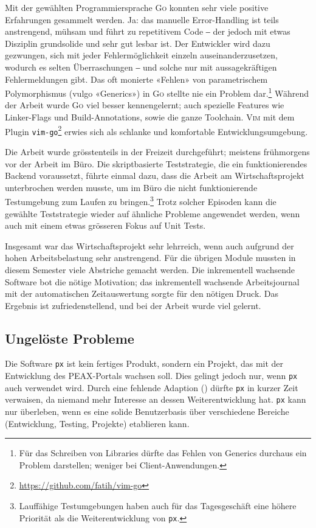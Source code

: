 Mit der gewählten Programmiersprache \textsc{Go} konnten sehr viele positive Erfahrungen gesammelt werden. Ja: das manuelle Error-Handling ist teils anstrengend, mühsam und führt zu repetitivem Code ‒ der jedoch mit etwas Disziplin grundsolide und sehr gut lesbar ist. Der Entwickler wird dazu gezwungen, sich mit jeder Fehlermöglichkeit einzeln auseinanderzusetzen, wodurch es selten Überraschungen ‒ und solche nur mit aussagekräftigen Fehlermeldungen gibt. Das oft monierte «Fehlen» von parametrischem Polymorphismus (vulgo «Generics») in \textsc{Go} stellte nie ein Problem dar.\footnote{Für das Schreiben von Libraries dürfte das Fehlen von Generics durchaus ein Problem darstellen; weniger bei Client-Anwendungen.} Während der Arbeit wurde \textsc{Go} viel besser kennengelernt; auch spezielle Features wie Linker-Flags und Build-Annotations, sowie die ganze Toolchain. \textsc{Vim} mit dem Plugin \texttt{vim-go}\footnote{\url{https://github.com/fatih/vim-go}} erwies sich als schlanke und komfortable Entwicklungsumgebung.

Die Arbeit wurde grösstenteils in der Freizeit durchgeführt; meistens frühmorgens vor der Arbeit im Büro. Die skriptbasierte Teststrategie, die ein funktionierendes Backend voraussetzt, führte einmal dazu, dass die Arbeit am Wirtschaftsprojekt unterbrochen werden musste, um im Büro die nicht funktionierende Testumgebung zum Laufen zu bringen.\footnote{Lauffähige Testumgebungen haben auch für das Tagesgeschäft eine höhere Priorität als die Weiterentwicklung von \texttt{px}.} Trotz solcher Episoden kann die gewählte Teststrategie wieder auf ähnliche Probleme angewendet werden, wenn auch mit einem etwas grösseren Fokus auf Unit Tests.

Insgesamt war das Wirtschaftsprojekt sehr lehrreich, wenn auch aufgrund der hohen Arbeitsbelastung sehr anstrengend. Für die übrigen Module mussten in diesem Semester viele Abstriche gemacht werden. Die inkrementell wachsende Software bot die nötige Motivation; das inkrementell wachsende Arbeitsjournal mit der automatischen Zeitauswertung sorgte für den nötigen Druck. Das Ergebnis ist zufriedenstellend, und bei der Arbeit wurde viel gelernt.

\subsection{Ungelöste Probleme}

Die Software \texttt{px} ist kein fertiges Produkt, sondern ein Projekt, das mit der Entwicklung des PEAX-Portals wachsen soll. Dies gelingt jedoch nur, wenn \texttt{px} auch verwendet wird. Durch eine fehlende Adaption () dürfte \texttt{px} in kurzer Zeit verwaisen, da niemand mehr Interesse an dessen Weiterentwicklung hat. \texttt{px} kann nur überleben, wenn es eine solide Benutzerbasis über verschiedene Bereiche (Entwicklung, Testing, Projekte) etablieren kann.

